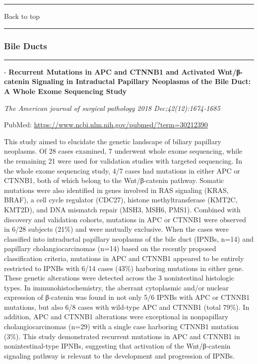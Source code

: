 \documentclass[]{article}
\begin{document}
{}

{}

\begin{center}\rule{0.5\linewidth}{\linethickness}\end{center}

Back to top

\begin{center}\rule{0.5\linewidth}{\linethickness}\end{center}

\pagebreak

\hypertarget{bile-ducts-1}{%
\subsubsection{Bile Ducts}\label{bile-ducts-1}}

\begin{center}\rule{0.5\linewidth}{\linethickness}\end{center}

 - \textbf{Recurrent Mutations in APC and CTNNB1 and Activated
Wnt/β-catenin Signaling in Intraductal Papillary Neoplasms of the Bile
Duct: A Whole Exome Sequencing Study}

\emph{The American journal of surgical pathology 2018
Dec;42(12):1674-1685}

PubMed: \url{https://www.ncbi.nlm.nih.gov/pubmed/?term=30212390}

This study aimed to elucidate the genetic landscape of biliary papillary
neoplasms. Of 28 cases examined, 7 underwent whole exome sequencing,
while the remaining 21 were used for validation studies with targeted
sequencing. In the whole exome sequencing study, 4/7 cases had mutations
in either APC or CTNNB1, both of which belong to the Wnt/β-catenin
pathway. Somatic mutations were also identified in genes involved in RAS
signaling (KRAS, BRAF), a cell cycle regulator (CDC27), histone
methyltransferase (KMT2C, KMT2D), and DNA mismatch repair (MSH3, MSH6,
PMS1). Combined with discovery and validation cohorts, mutations in APC
or CTNNB1 were observed in 6/28 subjects (21\%) and were mutually
exclusive. When the cases were classified into intraductal papillary
neoplasms of the bile duct (IPNBs, n=14) and papillary
cholangiocarcinomas (n=14) based on the recently proposed classification
criteria, mutations in APC and CTNNB1 appeared to be entirely restricted
to IPNBs with 6/14 cases (43\%) harboring mutations in either gene.
These genetic alterations were detected across the 3 nonintestinal
histologic types. In immunohistochemistry, the aberrant cytoplasmic
and/or nuclear expression of β-catenin was found in not only 5/6 IPNBs
with APC or CTNNB1 mutations, but also 6/8 cases with wild-type APC and
CTNNB1 (total 79\%). In addition, APC and CTNNB1 alterations were
exceptional in nonpapillary cholangiocarcinomas (n=29) with a single
case harboring CTNNB1 mutation (3\%). This study demonstrated recurrent
mutations in APC and CTNNB1 in nonintestinal-type IPNBs, suggesting that
activation of the Wnt/β-catenin signaling pathway is relevant to the
development and progression of IPNBs.
\end{document}
